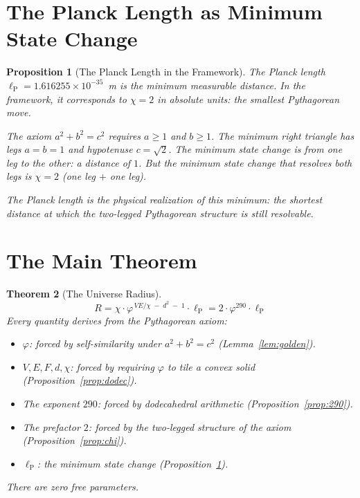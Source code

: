 \documentclass[11pt,a4paper]{article}
\theoremstyle{plain}
\newtheorem{theorem}{Theorem}[section]
\newtheorem{proposition}[theorem]{Proposition}
\theoremstyle{definition}
\newcommand{\lP}{\ell_{\mathrm{P}}}
\newcommand{\vp}{\varphi}
\begin{document}
\section{The Planck Length as Minimum State Change}\label{sec:planck}

\begin{proposition}[The Planck Length in the Framework]\label{prop:planck}
The Planck length $\lP = 1.616255 \times 10^{-35}$~m is the minimum
measurable distance.  In the framework, it corresponds to $\chi = 2$
in absolute units: the smallest Pythagorean move.

The axiom $a^2 + b^2 = c^2$ requires $a \geq 1$ and $b \geq 1$.  The
minimum right triangle has legs $a = b = 1$ and hypotenuse
$c = \sqrt{2}$.  The minimum \emph{state change} is from one leg to
the other: a distance of $1$.  But the minimum state change that
\emph{resolves both legs} is $\chi = 2$ (one leg $+$ one leg).

The Planck length is the physical realization of this minimum:
the shortest distance at which the two-legged Pythagorean structure
is still resolvable.
\end{proposition}

\section{The Main Theorem}\label{sec:main}

\begin{theorem}[The Universe Radius]\label{thm:main}
\[
  \boxed{\;
    R = \chi \cdot \vp^{\,VE/\chi \;-\; d^2 \;-\; 1} \cdot \lP
    = 2 \cdot \vp^{290} \cdot \lP
  \;}
\]
Every quantity derives from the Pythagorean axiom:
\begin{itemize}[nosep]
  \item $\vp$: forced by self-similarity under $a^2 + b^2 = c^2$
    (Lemma~\ref{lem:golden}).
  \item $V, E, F, d, \chi$: forced by requiring $\vp$ to tile a
    convex solid (Proposition~\ref{prop:dodec}).
  \item The exponent $290$: forced by dodecahedral arithmetic
    (Proposition~\ref{prop:290}).
  \item The prefactor $2$: forced by the two-legged structure of the
    axiom (Proposition~\ref{prop:chi}).
  \item $\lP$: the minimum state change (Proposition~\ref{prop:planck}).
\end{itemize}
There are zero free parameters.
\end{theorem}
\end{document}
